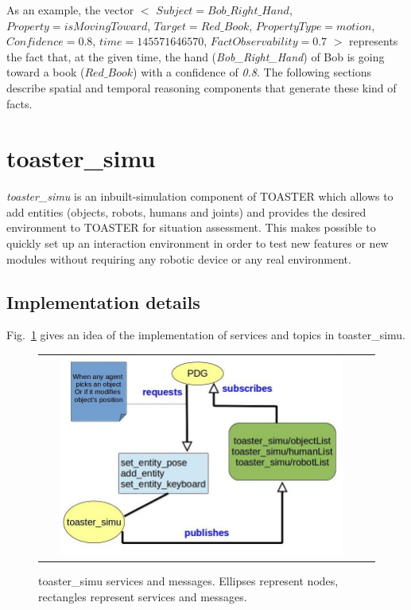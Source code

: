 \documentclass[a4paper]{article}
\begin{document}
As an example, the vector
$<$ $Subject = Bob\_Right\_Hand$, $Property = isMovingToward$, $Target = Red\_Book$, $PropertyType = motion$, $Confidence = 0.8$, $time = 145571646570$, $FactObservability = 0.7$ $>$ represents the fact that, at the given time, the hand (\textit{Bob\_Right\_Hand}) of Bob is going toward a book (\textit{$Red\_Book$}) with a confidence of \textit{0.8}. 
The following sections describe spatial and temporal reasoning components that generate these kind of facts.








\section{toaster\_simu}

\textit{toaster\_simu} is an inbuilt-simulation component of TOASTER which allows to add entities (objects, robots, humans and joints)
and provides the desired environment to TOASTER for situation assessment.
This makes possible to quickly set up an interaction environment in order to test new features or new modules without requiring any robotic device or any real environment.


\subsection{Implementation details}
Fig.~\ref{fig:toastersimu} gives an idea of the implementation of services and topics in toaster\_simu.


 \begin{figure}[ht!]
 \centering
 \begin{tabular}{cc}
  \includegraphics[width=0.9\textwidth]{img/toasterSimu.jpg}
 \end{tabular}
 \caption{toaster\_simu services and messages. Ellipses represent nodes, rectangles represent services and messages.}
 \label{fig:toastersimu}
 \end{figure}
\end{document}

